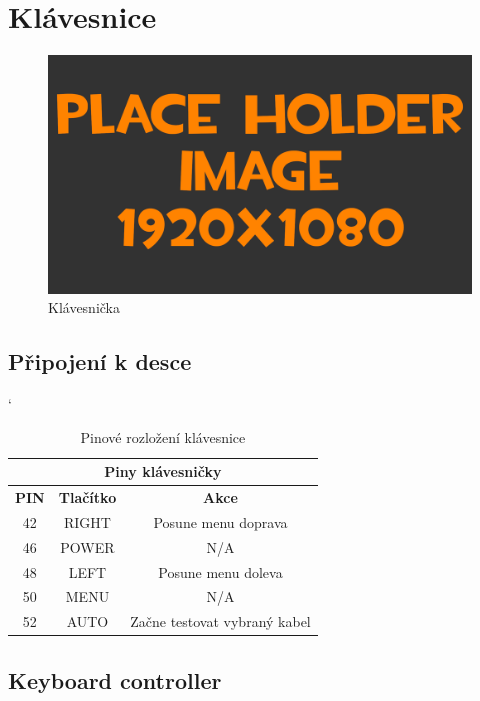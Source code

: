 
\section{Klávesnice}
\begin{figure}[h!]
	\centering
	\includegraphics[width=\textwidth]{pictures/placeHolderFHD.png}
    	\caption{Klávesnička}
   	\label{fig:keyborad}
\end{figure}

\subsection{Připojení k desce}
\begin{table} [h!]
	\centering
	\catcode` %
	\begin{tabular}[c]{|| c | c | c ||}
	\hline
		\multicolumn{3}{||c||}{Piny klávesničky} \\
	\hline
 		 \textbf{PIN} & \textbf{Tlačítko} & \textbf{Akce}\\
	\hline
		42 &  RIGHT & Posune menu doprava\\
	\hline
		46 & POWER & N/A\\
	\hline
		48 & LEFT & Posune menu doleva\\
	\hline
		50 & MENU & N/A\\
	\hline
		52 & AUTO & Začne testovat vybraný kabel\\
	\hline
	\end{tabular}
	\caption{Pinové rozložení klávesnice}
	\label{table:pinKB}
\end{table}

\newpage
\subsection{Keyboard controller}

